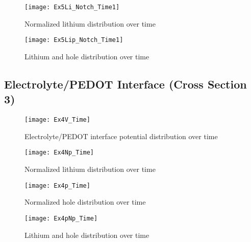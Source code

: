 \begin{landscape}
\begin{figure}[!htp]
\centering
\texttt{[image: Ex5Li\_Notch\_Time1]}
\caption{Normalized lithium distribution over time} 
\label{}
\end{figure}
\end{landscape}


\begin{landscape}
\begin{figure}[!htp]
\centering
\texttt{[image: Ex5Lip\_Notch\_Time1]}
\caption{Lithium and hole distribution over time} 
\label{}
\end{figure}
\end{landscape}


\clearpage
\subsection{Electrolyte/PEDOT Interface (Cross Section 3) }

\begin{landscape}
\begin{figure}[!htp]
\centering
\texttt{[image: Ex4V\_Time]}
\caption{Electrolyte/PEDOT interface potential distribution over time} 
\label{}
\end{figure}
\end{landscape}


\begin{landscape}
\begin{figure}[!htp]
\centering
\texttt{[image: Ex4Np\_Time]}
\caption{Normalized lithium distribution over time} 
\label{}
\end{figure}
\end{landscape}

\begin{landscape}
\begin{figure}[!htp]
\centering
\texttt{[image: Ex4p\_Time]}
\caption{Normalized hole distribution over time} 
\label{}
\end{figure}
\end{landscape}

\begin{landscape}
\begin{figure}[!htp]
\centering
\texttt{[image: Ex4pNp\_Time]}
\caption{Lithium and hole distribution over time} 
\label{}
\end{figure}
\end{landscape}






